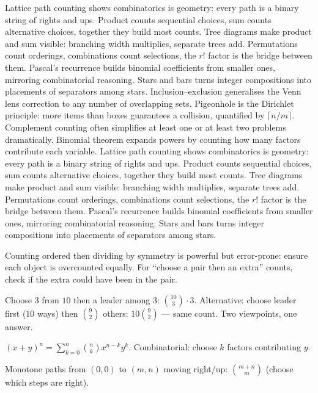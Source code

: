 Lattice path counting shows combinatorics is geometry: every path is a binary string of rights and ups.
Product counts sequential choices, sum counts alternative choices, together they build most counts.
Tree diagrams make product and sum visible: branching width multiplies, separate trees add.
Permutations count orderings, combinations count selections, the $r!$ factor is the bridge between them.
Pascal's recurrence builds binomial coefficients from smaller ones, mirroring combinatorial reasoning.
Stars and bars turns integer compositions into placements of separators among stars.
Inclusion--exclusion generalises the Venn lens correction to any number of overlapping sets.
Pigeonhole is the Dirichlet principle: more items than boxes guarantees a collision, quantified by $\lceil n/m\rceil$.
Complement counting often simplifies at least one or at least two problems dramatically.
Binomial theorem expands powers by counting how many factors contribute each variable.
Lattice path counting shows combinatorics is geometry: every path is a binary string of rights and ups.
Product counts sequential choices, sum counts alternative choices, together they build most counts.
Tree diagrams make product and sum visible: branching width multiplies, separate trees add.
Permutations count orderings, combinations count selections, the $r!$ factor is the bridge between them.
Pascal's recurrence builds binomial coefficients from smaller ones, mirroring combinatorial reasoning.
Stars and bars turns integer compositions into placements of separators among stars.
\begin{remark}
Counting ordered then dividing by symmetry is powerful but error-prone: ensure each object is overcounted equally. For ``choose a pair then an extra'' counts, check if the extra could have been in the pair.
\end{remark}

\begin{example}
Choose $3$ from $10$ then a leader among $3$: $ \binom{10}{3}\cdot3$. Alternative: choose leader first ($10$ ways) then $ \binom{9}{2}$ others: $10\binom{9}{2}$ --- same count. Two viewpoints, one answer.
\end{example}


\begin{theorem}
$(x+y)^n=\sum_{k=0}^{n}\binom{n}{k}x^{n-k}y^k$. Combinatorial: choose $k$ factors contributing $y$.
\end{theorem}

\begin{example}
Monotone paths from $(0,0)$ to $(m,n)$ moving right/up: $\binom{m+n}{m}$ (choose which steps are right).
\end{example}

